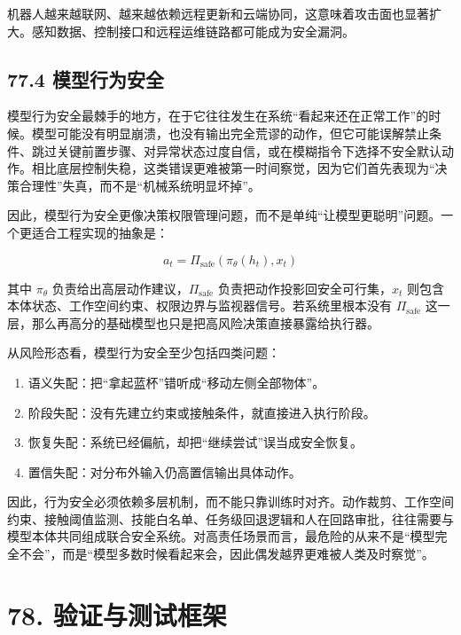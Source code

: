 机器人越来越联网、越来越依赖远程更新和云端协同，这意味着攻击面也显著扩大。感知数据、控制接口和远程运维链路都可能成为安全漏洞。

\subsection*{77.4 模型行为安全}


模型行为安全最棘手的地方，在于它往往发生在系统“看起来还在正常工作”的时候。模型可能没有明显崩溃，也没有输出完全荒谬的动作，但它可能误解禁止条件、跳过关键前置步骤、对异常状态过度自信，或在模糊指令下选择不安全默认动作。相比底层控制失稳，这类错误更难被第一时间察觉，因为它们首先表现为“决策合理性”失真，而不是“机械系统明显坏掉”。

因此，模型行为安全更像决策权限管理问题，而不是单纯“让模型更聪明”问题。一个更适合工程实现的抽象是：

\begingroup
\footnotesize
\begin{equation*}
a_t = \Pi_{\text{safe}}\!\left(\pi_\theta(h_t), x_t\right)
\end{equation*}
\endgroup

其中 \(\pi_\theta\) 负责给出高层动作建议，\(\Pi_{\text{safe}}\) 负责把动作投影回安全可行集，\(x_t\) 则包含本体状态、工作空间约束、权限边界与监视器信号。若系统里根本没有 \(\Pi_{\text{safe}}\) 这一层，那么再高分的基础模型也只是把高风险决策直接暴露给执行器。

从风险形态看，模型行为安全至少包括四类问题：

\begin{enumerate}
\item 语义失配：把“拿起蓝杯”错听成“移动左侧全部物体”。
\item 阶段失配：没有先建立约束或接触条件，就直接进入执行阶段。
\item 恢复失配：系统已经偏航，却把“继续尝试”误当成安全恢复。
\item 置信失配：对分布外输入仍高置信输出具体动作。
\end{enumerate}

因此，行为安全必须依赖多层机制，而不能只靠训练时对齐。动作裁剪、工作空间约束、接触阈值监测、技能白名单、任务级回退逻辑和人在回路审批，往往需要与模型本体共同组成联合安全系统。对高责任场景而言，最危险的从来不是“模型完全不会”，而是“模型多数时候看起来会，因此偶发越界更难被人类及时察觉”。

\section*{78. 验证与测试框架}

